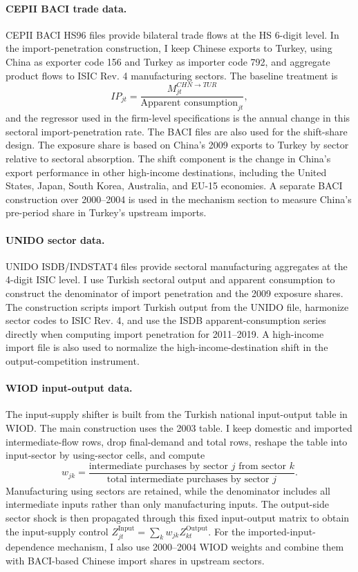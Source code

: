 ﻿\documentclass[12pt]{article}
\begin{document}
\paragraph{CEPII BACI trade data.} CEPII BACI HS96 files provide bilateral trade flows at the HS 6-digit level. In the import-penetration construction, I keep Chinese exports to Turkey, using China as exporter code 156 and Turkey as importer code 792, and aggregate product flows to ISIC Rev. 4 manufacturing sectors. The baseline treatment is
\[
IP_{jt}=\frac{M^{CHN\rightarrow TUR}_{jt}}{\text{Apparent consumption}_{jt}},
\]
and the regressor used in the firm-level specifications is the annual change in this sectoral import-penetration rate. The BACI files are also used for the shift-share design. The exposure share is based on China's 2009 exports to Turkey by sector relative to sectoral absorption. The shift component is the change in China's export performance in other high-income destinations, including the United States, Japan, South Korea, Australia, and EU-15 economies. A separate BACI construction over 2000--2004 is used in the mechanism section to measure China's pre-period share in Turkey's upstream imports.

\paragraph{UNIDO sector data.} UNIDO ISDB/INDSTAT4 files provide sectoral manufacturing aggregates at the 4-digit ISIC level. I use Turkish sectoral output and apparent consumption to construct the denominator of import penetration and the 2009 exposure shares. The construction scripts import Turkish output from the UNIDO file, harmonize sector codes to ISIC Rev. 4, and use the ISDB apparent-consumption series directly when computing import penetration for 2011--2019. A high-income import file is also used to normalize the high-income-destination shift in the output-competition instrument.

\paragraph{WIOD input-output data.} The input-supply shifter is built from the Turkish national input-output table in WIOD. The main construction uses the 2003 table. I keep domestic and imported intermediate-flow rows, drop final-demand and total rows, reshape the table into input-sector by using-sector cells, and compute
\[
w_{jk}=\frac{\text{intermediate purchases by sector }j\text{ from sector }k}{\text{total intermediate purchases by sector }j}.
\]
Manufacturing using sectors are retained, while the denominator includes all intermediate inputs rather than only manufacturing inputs. The output-side sector shock is then propagated through this fixed input-output matrix to obtain the input-supply control $Z^{\text{Input}}_{jt}=\sum_k w_{jk}Z^{\text{Output}}_{kt}$. For the imported-input-dependence mechanism, I also use 2000--2004 WIOD weights and combine them with BACI-based Chinese import shares in upstream sectors.
\end{document}
